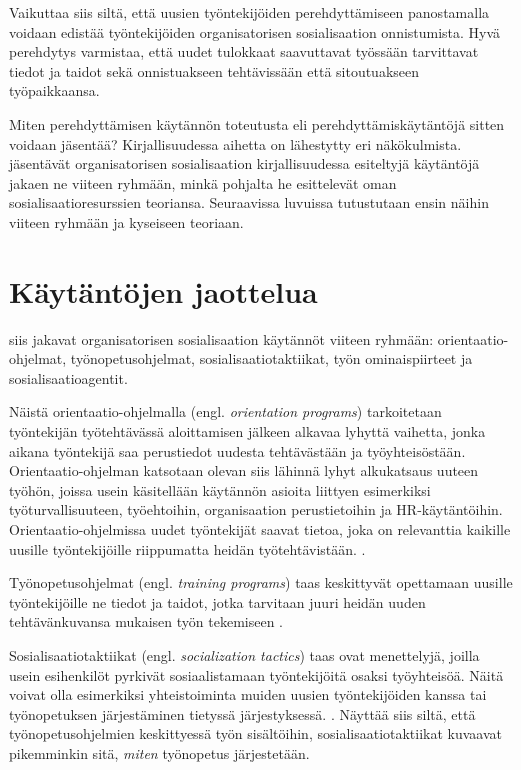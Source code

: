\documentclass[utf8]{gradu3}
\begin{document}
Vaikuttaa siis siltä, että uusien työntekijöiden perehdyttämiseen panostamalla voidaan edistää työntekijöiden organisatorisen sosialisaation onnistumista. Hyvä perehdytys varmistaa, että uudet tulokkaat saavuttavat työssään tarvittavat tiedot ja taidot sekä onnistuakseen tehtävissään että sitoutuakseen työpaikkaansa.

Miten perehdyttämisen käytännön toteutusta eli perehdyttämiskäytäntöjä sitten voidaan jäsentää? Kirjallisuudessa aihetta on lähestytty eri näkökulmista. \textcite{saks-gruman-2012} jäsentävät organisatorisen sosialisaation kirjallisuudessa esiteltyjä käytäntöjä jakaen ne viiteen ryhmään, minkä pohjalta he esittelevät oman sosialisaatioresurssien teoriansa. Seuraavissa luvuissa tutustutaan ensin näihin viiteen ryhmään ja kyseiseen teoriaan.

\section{Käytäntöjen jaottelua}

\textcite{saks-gruman-2012} siis jakavat organisatorisen sosialisaation käytännöt viiteen ryhmään: orientaatio-ohjelmat, työnopetusohjelmat, sosialisaatiotaktiikat, työn ominaispiirteet ja sosialisaatioagentit.

Näistä orientaatio-ohjelmalla (engl. \textit{orientation programs}) tarkoitetaan työntekijän työtehtävässä aloittamisen jälkeen alkavaa lyhyttä vaihetta, jonka aikana työntekijä saa perustiedot uudesta tehtävästään ja työyhteisöstään. Orientaatio-ohjelman katsotaan olevan siis lähinnä lyhyt alkukatsaus uuteen työhön, joissa usein käsitellään käytännön asioita liittyen esimerkiksi työturvallisuuteen, työehtoihin, organisaation perustietoihin ja HR-käytäntöihin. Orientaatio-ohjelmissa uudet työntekijät saavat tietoa, joka on relevanttia kaikille uusille työntekijöille riippumatta heidän työtehtävistään. \parencite{saks-gruman-2012}.

Työnopetusohjelmat (engl. \textit{training programs}) taas keskittyvät opettamaan uusille työntekijöille ne tiedot ja taidot, jotka tarvitaan juuri heidän uuden tehtävänkuvansa mukaisen työn tekemiseen \parencite{saks-gruman-2012}.

Sosialisaatiotaktiikat (engl. \textit{socialization tactics}) taas ovat menettelyjä, joilla usein esihenkilöt pyrkivät sosiaalistamaan työntekijöitä osaksi työyhteisöä. Näitä voivat olla esimerkiksi yhteistoiminta muiden uusien työntekijöiden kanssa tai työnopetuksen järjestäminen tietyssä järjestyksessä. \parencite{saks-gruman-2012}. Näyttää siis siltä, että työnopetusohjelmien keskittyessä työn sisältöihin, sosialisaatiotaktiikat kuvaavat pikemminkin sitä, \textit{miten} työnopetus järjestetään.
\end{document}
